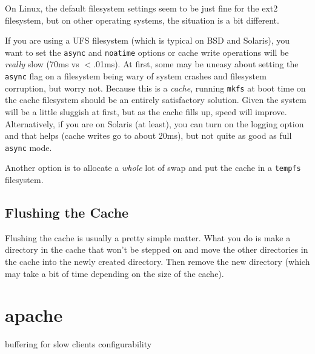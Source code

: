 \documentclass[titlepage]{manual}
\begin{document}
On Linux, the default filesystem settings seem to be just fine for the
ext2 filesystem, but on other operating systems, the situation is a
bit different.

If you are using a UFS filesystem (which is typical on BSD and Solaris),
you want to set the \texttt{async} and \texttt{noatime} options or cache
write operations will be \emph{really} slow (70ms vs $<$.01ms).  At first,
some may be uneasy about setting the \texttt{async} flag on a filesystem
being wary of system crashes and filesystem corruption, but worry not.
Because this is a \emph{cache}, running \texttt{mkfs} at boot time on the
cache filesystem should be an entirely satisfactory solution.  Given the
system will be a little sluggish at first, but as the cache fills up, speed
will improve.  Alternatively, if you are on Solaris (at least), you can 
turn on the logging option and that helps (cache writes go to about 20ms),
but not quite as good as full \texttt{async} mode.

Another option is to allocate a \emph{whole} lot of swap and put the
cache in a \texttt{tempfs} filesystem.
 
\subsection{Flushing the Cache}
Flushing the cache is usually a pretty simple matter.  What you do is
make a directory in the cache that won't be stepped on and move the
other directories in the cache into the newly created directory.  Then
remove the new directory (which may take a bit of time depending on
the size of the cache).

\section{apache}
    buffering for slow clients
    configurability
\end{document}
